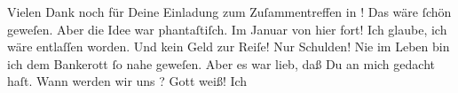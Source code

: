 \pstart
           {\pb}Vielen Dank noch für Deine Einladung zum
               Zuſammentreffen in \label{K_L02762-5v}\label{K_L02762-5}! Das wäre ſchön
               geweſen. Aber die Idee war phantaſtiſch. Im Januar von
               hier fort! Ich glaube, ich wäre entlaſſen worden. Und kein Geld zur Reiſe! Nur
               Schulden! Nie im Leben bin ich dem Bankerott ſo nahe geweſen. Aber es war lieb, daß
               Du an mich gedacht haſt. Wann {\pb}werden wir uns
                  \label{K_L02762-6v}\label{K_L02762-6}? Gott weiß! Ich
